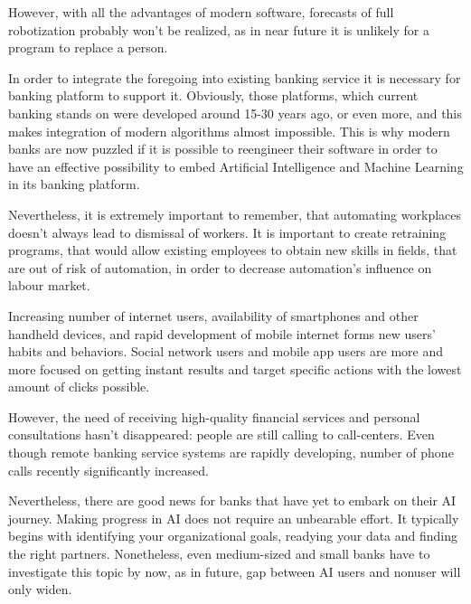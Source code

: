 However, with all the advantages of modern software, forecasts of full robotization probably won't be realized, as in near future it is unlikely for a program to replace a person.
\cite{deluxe_mid_size_banks_risk}

In order to integrate the foregoing into existing banking service it is necessary for banking platform to support it.
Obviously, those platforms, which current banking stands on were developed around 15-30 years ago, or even more, and this makes integration of modern algorithms almost impossible. 
This is why modern banks are now puzzled if it is possible to reengineer their software in order to have an effective possibility to embed Artificial Intelligence and Machine Learning in its banking platform.

Nevertheless, it is extremely important to remember, that automating workplaces doesn't always lead to dismissal of workers.
It is important to create retraining programs, that would allow existing employees to obtain new skills in fields,
that are out of risk of automation, in order to decrease automation's influence on labour market.

Increasing number of internet users, availability of smartphones and other handheld devices, and rapid development of mobile internet forms new users' habits and behaviors.
Social network users and mobile app users are more and more focused on getting instant results and target specific actions with the lowest amount of clicks possible.

However, the need of receiving high-quality financial services and personal consultations hasn't disappeared: people are still calling to call-centers.
Even though remote banking service systems are rapidly developing, number of phone calls recently significantly increased. 

Nevertheless, there are good news for banks that have yet to embark on their AI journey. 
Making progress in AI does not require an unbearable effort.
It typically begins with identifying your organizational goals, readying your data and finding the right partners.
Nonetheless, even medium-sized and small banks have to investigate this topic by now, as in future, gap between AI users and nonuser will only widen.





